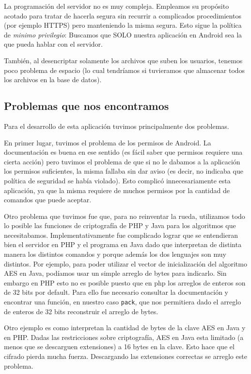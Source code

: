La programación del servidor no es muy compleja. Empleamos su propósito acotado para tratar de hacerla segura sin recurrir a complicados 
procedimientos (por ejemplo HTTPS) pero manteniendo la misma segura. Esto sigue la política de \textit{minimo privilegio}: Buscamos que SOLO
nuestra aplicación en Android sea la que pueda hablar con el servidor.

También, al desencriptar solamente los archivos que suben los usuarios, tenemos poco problema 
de espacio (lo cual tendríamos si tuvieramos que almacenar todos los archivos en la base de
datos).

\subsection{Problemas que nos encontramos}

Para el desarrollo de esta aplicación tuvimos principalmente dos
problemas.

En primer lugar, tuvimos el problema de los permisos de Android. La 
documentaci\'on es buena en ese sentido (es fácil saber que permisos requiere
una cierta acción) pero tuvimos el problema de que si no le dabamos a la
aplicación los permisos suficientes, la misma fallaba sin dar aviso (es 
decir, no indicaba que política de seguridad se había violado). Esto
complicó innecesariamente esta aplicación, ya que la misma requiere de 
muchos permisos por la cantidad de comandos que puede aceptar.

Otro problema que tuvimos fue que, para no reinventar la rueda, utilizamos
todo lo posible las funciones de criptografía de PHP y Java para los
algoritmos que necesitabamos. Implementativamente fue complicado lograr
que se entendieran bien el servidor en PHP y el programa en Java dado que
interpretan de distinta manera los distintos comandos y porque además los
dos lenguajes son muy distintos. Por ejemplo, para poder utilizar el vector
de inicialización del algoritmo AES en Java, podíamos usar un simple
arreglo de bytes para indicarlo. Sin embargo en PHP esto no es posible
puesto que en php los arreglos de enteros son de 32 bits por default. Para
ello fue necesario consultar la documentaci\'on y encontrar una función,
en nuestro caso \texttt{pack}, que nos permitiera dado el arreglo de enteros
de 32 bits reconstruir el arreglo de bytes.

Otro ejemplo es como interpretan la cantidad de bytes de la clave AES en
Java y en PHP. Dadas las restricciones sobre criptografía, AES en Java
esta limitado (a menos que se descarguen extensiones) a 16 bytes en la clave. 
Esto hace que el cifrado pierda mucha fuerza. Descargando las extensiones
correctas se arreglo este problema.

